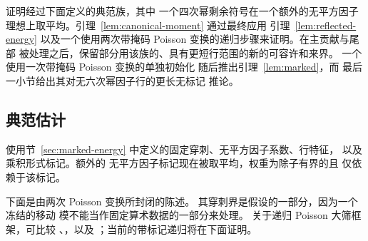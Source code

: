 \documentclass[11pt,a4paper]{article}
\numberwithin{equation}{section}
\numberwithin{figure}{section}
\theoremstyle{definition}
\theoremstyle{remark}
\begin{document}
证明经过下面定义的典范族，其中
一个四次幂剩余符号在一个额外的无平方因子
理想上取平均。引理~\ref{lem:canonical-moment} 通过最终应用
引理~\ref{lem:reflected-energy} 以及一个使用两次带掩码
Poisson 变换的递归步骤来证明。在主贡献与尾部
被处理之后，保留部分用该族的、具有更短行范围的新的可容许和来界。
一个使用一次带掩码 Poisson 变换的单独初始化
随后推出引理~\ref{lem:marked}，而
最后一小节给出其对无六次幂因子行的更长无标记
推论。

\subsection{典范估计}

使用节~\ref{sec:marked-energy} 中定义的固定穿刺、无平方因子系数、行特征，
以及乘积形式标记。额外的
无平方因子标记现在被取平均，权重为除子有界的且
仅依赖于该标记。

下面是由两次 Poisson 变换所封闭的陈述。
其穿刺界是假设的一部分，因为一个冻结的移动
模不能当作固定算术数据的一部分来处理。
关于递归 Poisson 大筛框架，可比较
\cite[节~2]{HBQuadratic}、\cite[节~4]{HB}，以及
\cite[节~4--7]{GL}；当前的带标记递归将在下面证明。
\end{document}

